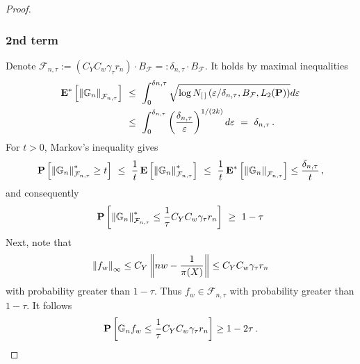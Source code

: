 \begin{proof}
\subsubsection*{2nd term}
Denote
$
  \mathcal{F}_{n,\tau}
  :=
  (
  C_Y
  C_w
  \gamma_\tau
  r_n
  )
  \cdot
  B_\mathcal{F}
  =:
  \delta_{n,\tau}
  \cdot
  B_\mathcal{F}
$.
It holds by maximal inequalities
\begin{align*}
  \E^*\left[ 
    \norm{\G_n}_{\mathcal{F}_{n,\tau}}
  \right]
  &
  \ 
  \le
  \ 
  \int_0^{\delta{n,\tau}}
  \sqrt{
    \log 
    N_{[\,]}
    \left( 
      \varepsilon / \delta_{n,\tau}
    ,
    B_{\mathcal{F}}
    ,
    L_2(\P)
    \right)
  }
  d\varepsilon
  \\
  &
  \ 
  \le
  \ 
  \int_0^{\delta_{n,\tau}}
  \left( 
    \frac{\delta_{n,\tau}}{\varepsilon}
  \right)^{1/(2k)}
  d \varepsilon
  \ 
  =
  \ 
  \delta_{n,\tau}
  \,.
\end{align*}
For $t>0$,
Markov's inequality gives
\begin{gather}
  \P\left[
  \norm{\G_n}^*_{\mathcal{F}_{n,\tau}}
   \ge t
  \right]
  \ 
  \le
  \ 
  \frac{1
  }{t}
  \,
    \E\left[
  \norm{\G_n}^*_{\mathcal{F}_{n,\tau}}
    \right]
  \ 
  \le
  \ 
  \frac{1
  }{t}
  \,
    \E^*\left[
  \norm{\G_n}_{\mathcal{F}_{n,\tau}}
    \right]
    \le
    \frac{\delta_{n,\tau}}{t}
    \,,
\end{gather}
and consequently
\begin{gather}
  \P\left[
  \norm{\G_n}^*_{\mathcal{F}_{n,\tau}}
  \le 
  \frac{1}{\tau}
  C_Y
  C_w
  \gamma_\tau
  r_n
  \right]
  \ 
  \ge
  \ 
  1-\tau
\end{gather}
Next, note that
\begin{gather}
  \left\lVert f_w\right\rVert_\infty
  \le
  C_Y
  \left\lVert nw- \frac{1}{\pi(X)}\right\rVert
  \le
  C_Y
  C_w
  \gamma_\tau
  r_n
\end{gather}
with probability greater than $1-\tau$.
Thus 
$
f_w \in \mathcal{F}_{n,\tau}
$
with probability greater than $1-\tau$.
It follows
\begin{gather}
  \mathbf{P}
  \left[
  \mathbb{G}_n f_w \le 
  \frac{1}{\tau}
  C_Y
  C_w
  \gamma_\tau
  r_n
  \right]
  \ge
  1 - 2\tau
  \,.
\end{gather}

\end{proof}
